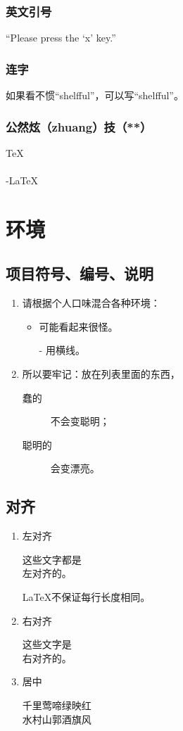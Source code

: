\documentclass[12pt]{article}
\begin{document}
\subsubsection{英文引号}
``Please press the `x' key.''

\subsubsection{连字}
如果看不惯``shelfful''，可以写``shelf\mbox{}ful''。

\subsubsection{公然炫（zhuang）技（**）}
\TeX \\
\LaTeXe \\
\AmS-\LaTeX \\

\section{环境}
\subsection{项目符号、编号、说明}
\begin{enumerate}
	\item 请根据个人口味混合各种环境：
	\begin{itemize}
		\item 可能看起来很怪。
		\item[-] 用横线。
	\end{itemize}
	\item 所以要牢记：放在列表里面的东西，
	\begin{description}
    	\item[蠢的]不会变聪明；
    	\item[聪明的]会变漂亮。
	\end{description}
\end{enumerate}

\subsection{对齐}
\begin{enumerate}
	\item 左对齐
	\begin{flushleft}
		这些文字都是\\ 左对齐的。

		\LaTeX{}不保证每行长度相同。
	\end{flushleft}
	\item 右对齐
	\begin{flushright}
		这些文字是\\ 右对齐的。
	\end{flushright}
	\item{居中}
	\begin{center}
		千里莺啼绿映红\\水村山郭酒旗风
	\end{center}
\end{enumerate}
\end{document}
